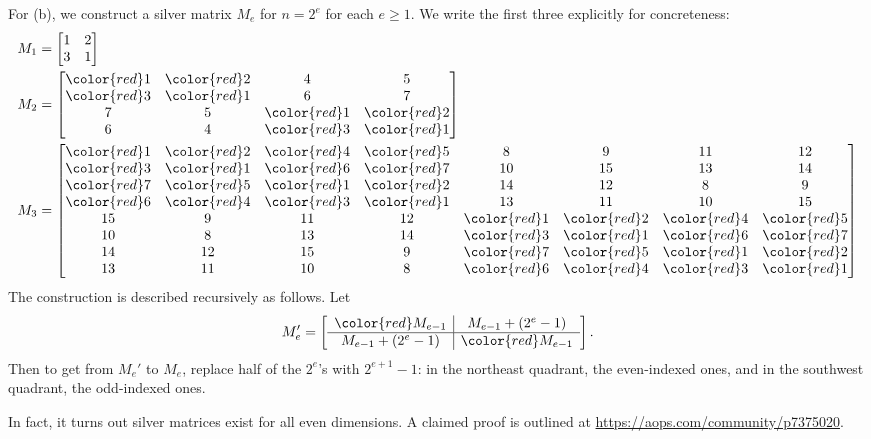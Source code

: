 For (b), we construct a silver matrix $M_e$ for $n = 2^e$ for each $e \ge 1$.
We write the first three explicitly for concreteness:
\begin{align*}
  M_1 &= \begin{bmatrix}
    1 & 2 \\ 3 & 1
  \end{bmatrix} \\
  M_2 &= \begin{bmatrix}
    {\color{red}1} & {\color{red}2} & 4 & 5 \\
    {\color{red}3} & {\color{red}1} & 6 & 7 \\
    7 & 5 & {\color{red}1} & {\color{red}2} \\
    6 & 4 & {\color{red}3} & {\color{red}1}
  \end{bmatrix} \\
  M_3 &= \begin{bmatrix}
    {\color{red}1} & {\color{red}2} & {\color{red}4} & {\color{red}5} & 8 & 9 & 11 & 12\\
    {\color{red}3} & {\color{red}1} & {\color{red}6} & {\color{red}7} & 10 & 15 & 13 & 14 \\
    {\color{red}7} & {\color{red}5} & {\color{red}1} & {\color{red}2} & 14 & 12 & 8 & 9 \\
    {\color{red}6} & {\color{red}4} & {\color{red}3} & {\color{red}1} & 13 & 11 & 10 & 15 \\
    15 & 9 & 11 & 12 & {\color{red}1} & {\color{red}2} & {\color{red}4}
    & {\color{red}5} \\
    10 & 8 & 13 & 14 & {\color{red}3} & {\color{red}1} & {\color{red}6}
    & {\color{red}7} \\
    14 & 12 & 15 & 9 & {\color{red}7} & {\color{red}5} & {\color{red}1}
    & {\color{red}2} \\
    13 & 11 & 10 & 8 & {\color{red}6} & {\color{red}4} & {\color{red}3}
    & {\color{red}1} \\
  \end{bmatrix}
\end{align*}
The construction is described recursively as follows.
Let
\[
  M_e' = \left[
  \begin{array}{c|c}
    {\color{red}M_{e-1}} & M_{e-1} + (2^e-1) \\ \hline
    M_{e-1} + (2^e-1) & {\color{red}M_{e-1}} \\
  \end{array}
  \right].
\]
Then to get from $M_e'$ to $M_e$,
replace half of the $2^e$'s with $2^{e+1}-1$:
in the northeast quadrant, the even-indexed ones,
and in the southwest quadrant, the odd-indexed ones.

\begin{remark*}
  In fact, it turns out silver matrices exist for all even dimensions.
  A claimed proof is outlined at \url{https://aops.com/community/p7375020}.
\end{remark*}
\pagebreak